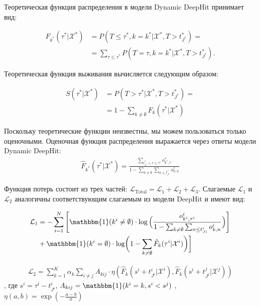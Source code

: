 \documentclass{article}
\begin{document}
Теоретическая функция распределения в модели Dynamic DeepHit принимает вид:

\begin{equation}
	\begin{aligned}
		F_{k^{*}}(\tau^{*}|\mathcal{X}^{*}) & = P(T\leq\tau^{*},k=k^{*}|\mathcal{X}^{*},T>t_{J^{*}}^{*}) = \\
		& =\sum_{\tau\leq\tau^*}P(T=\tau,k=k^*|\mathcal{X}^*,T>t_{J^*}^*).
	\end{aligned}
\end{equation}

Теоретическая функция выживания вычисляется следующим образом:

\begin{equation}
	\begin{aligned}
		S(\tau^{*}|\mathcal{X}^{*}) & = 
		 	P(T>\tau^*|\mathcal{X}^*,T>t_{J^*}^*) =\\
		& =1-\sum_{k\neq\emptyset}F_k(\tau^*|\mathcal{X}^*)
	\end{aligned}
\end{equation}

Поскольку теоретические функции неизвестны, мы можем пользоваться только оценочными. Оценочная функция распределения выражается через ответы модели Dynamic DeepHit:
\begin{equation}
	\begin{aligned}
\hat{F}_{k^*}(\tau^*|\mathcal{X}^*)=\frac{\sum_{t_{J^*}^*<\tau\leq\tau^*}o_{k^*,\tau}^*}{1-\sum_{k\neq\emptyset}\sum_{n\leq t_{J^*}^*}o_{k,n}^*}
	\end{aligned}
\end{equation}

Функция потерь состоит из трех частей: $\mathcal{L}_{\mathrm{Total}}=\mathcal{L}_1+\mathcal{L}_2+\mathcal{L}_3$. Слагаемые $\mathcal{L}_1$ и $\mathcal{L}_2$ аналогичны соответствующим слагаемым из модели DeepHit и имеют вид: 

\begin{equation}
	\begin{aligned}
		\mathcal{L}_{1} & =-\sum_{i=1}^N\left[\mathbbm{1}(k^i\neq\emptyset)\cdot\log\Big(\frac{o_{k^i,\tau^i}^i}{1-\sum_{k\neq\emptyset}\sum_{n\leq t_{Ji}^i}o_{k,n}^i}\Big)\right] \\
		& +\mathbbm{1}(k^i=\emptyset)\cdot\log\biggl(1-\sum_{k\neq\emptyset}\hat{F}_k(\tau^i|\mathcal{X}^i)\biggr)\biggr]
	\end{aligned}
\end{equation}

\begin{equation}
	\begin{aligned}
\mathcal{L}_2=\sum_{k=1}^K\alpha_k\sum_{i\neq j}A_{kij}\cdot\eta\left(\hat{F}_k(s^i+t_{J^i}^i|\mathcal{X}^i),\hat{F}_k(s^i+t_{J^j}^j|\mathcal{X}^j)\right)
	\end{aligned}
\end{equation}
, где $s^i=\tau^i-t_{J^i}^i$, $A_{kij}=\mathbbm{1}(k^i=k,s^i<s^j)$ , $\eta(a,b)=\exp\left(-\frac{a-b}{\sigma}\right)$
\end{document}
